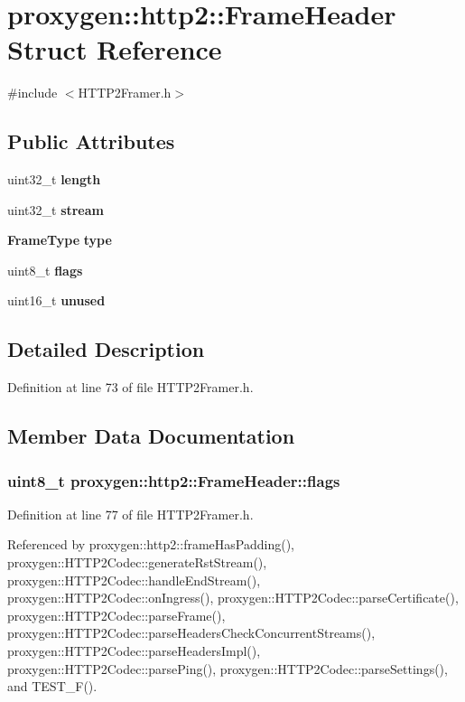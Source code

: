 \section{proxygen\+:\+:http2\+:\+:Frame\+Header Struct Reference}
\label{structproxygen_1_1http2_1_1FrameHeader}


{\ttfamily \#include $<$H\+T\+T\+P2\+Framer.\+h$>$}

\subsection*{Public Attributes}
\begin{DoxyCompactItemize}
\item 
uint32\+\_\+t {\bf length}
\item 
uint32\+\_\+t {\bf stream}
\item 
{\bf Frame\+Type} {\bf type}
\item 
uint8\+\_\+t {\bf flags}
\item 
uint16\+\_\+t {\bf unused}
\end{DoxyCompactItemize}


\subsection{Detailed Description}


Definition at line 73 of file H\+T\+T\+P2\+Framer.\+h.



\subsection{Member Data Documentation}
\subsubsection[{flags}]{\setlength{\rightskip}{0pt plus 5cm}uint8\+\_\+t proxygen\+::http2\+::\+Frame\+Header\+::flags}\label{structproxygen_1_1http2_1_1FrameHeader_a27a246396f3d5db4f563d9dfe310224d}


Definition at line 77 of file H\+T\+T\+P2\+Framer.\+h.



Referenced by proxygen\+::http2\+::frame\+Has\+Padding(), proxygen\+::\+H\+T\+T\+P2\+Codec\+::generate\+Rst\+Stream(), proxygen\+::\+H\+T\+T\+P2\+Codec\+::handle\+End\+Stream(), proxygen\+::\+H\+T\+T\+P2\+Codec\+::on\+Ingress(), proxygen\+::\+H\+T\+T\+P2\+Codec\+::parse\+Certificate(), proxygen\+::\+H\+T\+T\+P2\+Codec\+::parse\+Frame(), proxygen\+::\+H\+T\+T\+P2\+Codec\+::parse\+Headers\+Check\+Concurrent\+Streams(), proxygen\+::\+H\+T\+T\+P2\+Codec\+::parse\+Headers\+Impl(), proxygen\+::\+H\+T\+T\+P2\+Codec\+::parse\+Ping(), proxygen\+::\+H\+T\+T\+P2\+Codec\+::parse\+Settings(), and T\+E\+S\+T\+\_\+\+F().


